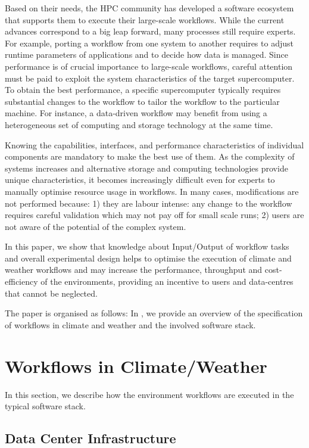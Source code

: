 \documentclass[a4paper]{article}
\newcommand{\jk}[1]{\todo[inline]{JK: #1}}
\begin{document}
Based on their needs, the HPC community has developed a software ecosystem that supports them to execute their large-scale workflows.
While the current advances correspond to a big leap forward, many processes still require experts.
For example, porting a workflow from one system to another requires to adjust runtime parameters of applications and to decide how data is managed.
Since performance is of crucial importance to large-scale workflows, careful attention must be paid to exploit the system characteristics of the target supercomputer.
To obtain the best performance, a specific supercomputer typically requires substantial changes to the workflow to tailor the workflow to the particular machine.
For instance, a data-driven workflow may benefit from using a heterogeneous set of computing and storage technology at the same time.

Knowing the capabilities, interfaces, and performance characteristics of individual components are mandatory to make the best use of them.
As the complexity of systems increases and alternative storage and computing technologies provide unique characteristics, it becomes increasingly difficult even for experts to manually optimise resource usage in workflows. In many cases, modifications are not performed because: 1) they are labour intense: any change to the workflow requires careful validation which may not pay off for small scale runs; 2) users are not aware of the potential of the complex system.

In this paper, we show that knowledge about Input/Output of workflow tasks and overall experimental design helps to
optimise the execution of climate and weather workflows and may increase the performance, throughput and cost-efficiency of the environments, providing an incentive to users and data-centres that cannot be neglected.

The paper is organised as follows:
In , we provide an overview of the specification of workflows in climate and weather and the involved software stack.

\jk{TODO}


\section{Workflows in Climate/Weather}
\label{sec:workflows}

In this section, we describe how the environment workflows are executed in the typical software stack.

\subsection{Data Center Infrastructure}
\end{document}
